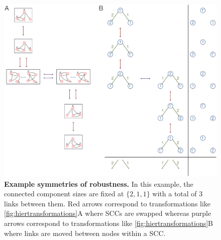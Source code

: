 \begin{figure}[!ht]
\centering
\noindent\includegraphics[width=0.9\columnwidth]{fig/robustnesssymmetries.pdf}
\caption{{\bf Example symmetries of robustness.} In this example, the connected component sizes are fixed at $\{2,1,1\}$ with a total of $3$ links between them. Red arrows correspond to transformations like \ref{fig:hiertransformations}A where SCCs are swapped whereas purple arrows correspond to transformations like \ref{fig:hiertransformations}B where links are moved between nodes within a SCC.}
\label{fig:robustnesssymmetries}
\end{figure}


